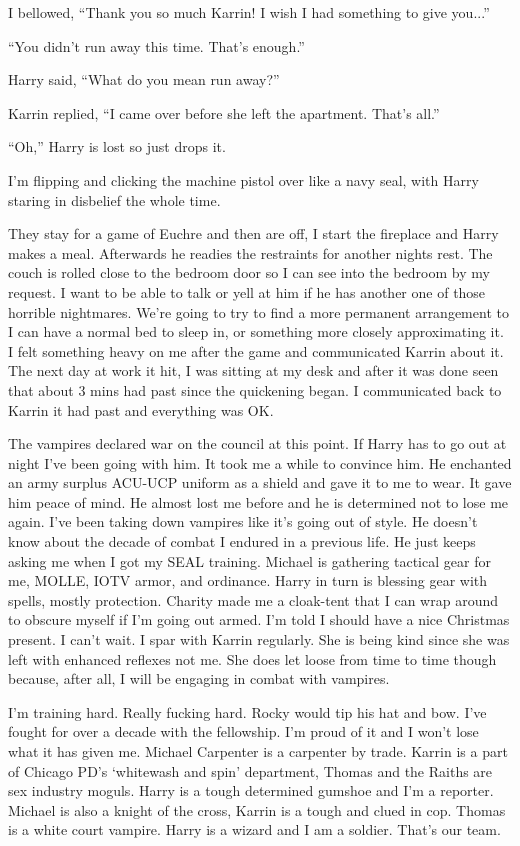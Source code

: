 I bellowed, ``Thank you so much Karrin! I wish I had something to give you...''

``You didn't run away this time. That's enough.''

Harry said, ``What do you mean run away?''

Karrin replied, ``I came over before she left the apartment. That's all.''

``Oh,'' Harry is lost so just drops it.

I'm flipping and clicking the machine pistol over like a navy seal, with Harry staring in disbelief the whole time.

They stay for a game of Euchre and then are off, I start the fireplace and Harry makes a meal. Afterwards he readies the restraints for another nights rest. The couch is rolled close to the bedroom door so I can see into the bedroom by my request. I want to be able to talk or yell at him if he has another one of those horrible nightmares. We're going to try to find a more permanent arrangement to I can have a normal bed to sleep in, or something more closely approximating it. I felt something heavy on me after the game and communicated Karrin about it. The next day at work it hit, I was sitting at my desk and after it was done seen that about 3 mins had past since the quickening began. I communicated back to Karrin it had past and everything was OK.

The vampires declared war on the council at this point. If Harry has to go out at night I've been going with him. It took me a while to convince him. He enchanted an army surplus ACU-UCP uniform as a shield and gave it to me to wear. It gave him peace of mind. He almost lost me before and he is determined not to lose me again. I've been taking down vampires like it's going out of style. He doesn't know about the decade of combat I endured in a previous life. He just keeps asking me when I got my SEAL training. Michael is gathering tactical gear for me, MOLLE, IOTV armor, and ordinance. Harry in turn is blessing gear with spells, mostly protection. Charity made me a cloak-tent that I can wrap around to obscure myself if I'm going out armed. I'm told I should have a nice Christmas present. I can't wait. I spar with Karrin regularly. She is being kind since she was left with enhanced reflexes not me. She does let loose from time to time though because, after all, I will be engaging in combat with vampires. 

I'm training hard. Really fucking hard. Rocky would tip his hat and bow. I've fought for over a decade with the fellowship. I'm proud of it and I won't lose what it has given me. Michael Carpenter is a carpenter by trade. Karrin is a part of Chicago PD's `whitewash and spin' department, Thomas and the Raiths are sex industry moguls. Harry is a tough determined gumshoe and I'm a reporter. Michael is also a knight of the cross, Karrin is a tough and clued in cop. Thomas is a white court vampire. Harry is a wizard and I am a soldier. That's our team.

